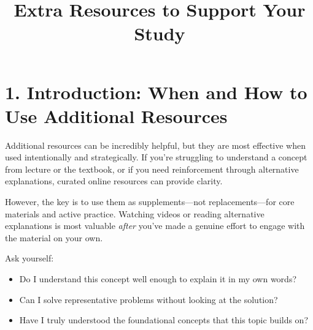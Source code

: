 \documentclass[12pt]{article}
\title{Extra Resources to Support Your Study}
\date{}
\begin{document}
\maketitle

\section*{1. Introduction: When and How to Use Additional Resources}

Additional resources can be incredibly helpful, but they are most effective when used intentionally and strategically. If you’re struggling to understand a concept from lecture or the textbook, or if you need reinforcement through alternative explanations, curated online resources can provide clarity.

However, the key is to use them as supplements—not replacements—for core materials and active practice. Watching videos or reading alternative explanations is most valuable \emph{after} you’ve made a genuine effort to engage with the material on your own.

Ask yourself:
\begin{itemize}
    \item Do I understand this concept well enough to explain it in my own words?
    \item Can I solve representative problems without looking at the solution?
    \item Have I truly understood the foundational concepts that this topic builds on?
\end{itemize}
\end{document}
